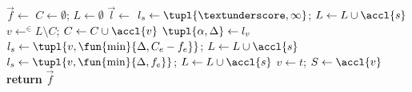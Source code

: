 \begin{algorithmic}
\State $\vec{f}\gets$
\State $C\gets\emptyset$; $L\gets\emptyset$
\Repeat
\State $\vec{l}\gets$
\State $l_s\gets\tupl{\textunderscore,\infty}$; $L\gets L\cup\accl{s}$
\State $v\gets^{\in}L\setminus C$; $C\gets C\cup\accl{v}$
\State $\tupl{\alpha,\Delta}\gets l_v$
\State $l_s\gets\tupl{v,\fun{\min}{\Delta,C_e-f_e}}$; $L\gets L\cup\accl{s}$
\EndIf
\EndFor
{}
\State $l_s\gets\tupl{v,\fun{\min}{\Delta,f_e}}$; $L\gets L\cup\accl{s}$
\EndIf
\EndFor
\EndWhile
{}
\State $v\gets t$; $S\gets\accl{v}$
\EndIf
{}
\State \textbf{return} $\vec{f}$
\EndFunction
\end{algorithmic}